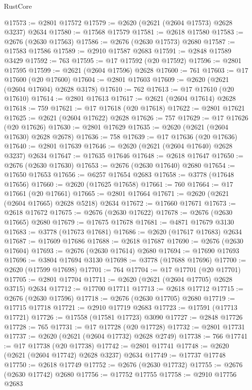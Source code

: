 \begin{lexlean}{RustCore}
\begin{coremodule}
@17573 := @2801 @17572
@17579 := @2620 (@2621 (@2604 @17573) @2628 @3237) @2634
@17580 := @17568 @17579
@17581 := @2618 @17580
@17583 := @2676 (@2630 @17563)
@17586 := @2676 (@2630 @17573) @2680
@17587 := @17583 @17586
@17589 := @2910 @17587 @2683
@17591 := @2848 @17589 @3429
@17592 := 763
@17595 := @17 @17592 (@20 @17592)
@17596 := @2801 @17595
@17599 := @2621 (@2604 @17596) @2628
@17600 := 761
@17603 := @17 @17600 (@20 @17600)
@17604 := @2801 @17603
@17609 := @2620 (@2621 (@2604 @17604) @2628 @3178)
@17610 := 762
@17613 := @17 @17610 (@20 @17610)
@17614 := @2801 @17613
@17617 := @2621 (@2604 @17614) @2628
@17618 := 759
@17621 := @17 @17618 (@20 @17618)
@17622 := @2801 @17621
@17625 := @2621 (@2604 @17622) @2628
@17626 := 757
@17629 := @17 @17626 (@20 @17626)
@17630 := @2801 @17629
@17635 := @2620 (@2621 (@2604 @17630) @2628 @2678)
@17636 := 758
@17639 := @17 @17636 (@20 @17636)
@17640 := @2801 @17639
@17646 := @2620 (@2621 (@2604 @17640) @2628 @3237) @2634
@17647 := @17635 @17646
@17648 := @2618 @17647
@17650 := @2676 (@2630 @17630)
@17653 := @2676 (@2630 @17640) @2680
@17654 := @17650 @17653
@17656 := @6257 @17654 @2683
@17658 := @3778 (@17648 @17656)
@17660 := @2620 (@17625 @17658)
@17661 := 760
@17664 := @17 @17661 (@20 @17661)
@17665 := @2801 @17664
@17671 := @2620 (@2621 (@2604 @17665) @2628 @5218) @2634
@17672 := @17660 @17671
@17673 := @2618 @17672
@17675 := @2676 (@2630 @17622)
@17678 := @2676 (@2630 @17665) @2680
@17679 := @17675 @17678
@17681 := @4871 @17679 @3130
@17683 := @3778 (@17673 @17681)
@17686 := @2620 (@17617 @17683) @2634
@17687 := @17609 @17686
@17688 := @2618 @17687
@17690 := @2676 (@2630 @17604)
@17693 := @2676 (@2630 @17614) @2680
@17694 := @17690 @17693
@17696 := @3804 @17694 @3130
@17698 := @3778 (@17688 @17696)
@17700 := @2620 (@17599 @17698)
@17701 := 764
@17704 := @17 @17701 (@20 @17701)
@17705 := @2801 @17704
@17711 := @2620 (@2621 (@2604 @17705) @2628 @3715) @2634
@17712 := @17700 @17711
@17713 := @2618 @17712
@17715 := @2676 (@2630 @17596)
@17718 := @2676 (@2630 @17705) @2680
@17719 := @17715 @17718
@17721 := @2910 @17719 @2683
@17723 := @17591 (@17713 @17721)
@17726 := @17558 (@17581 @17723) @3090
@17727 := @2848 @17726
@17728 := 765
@17731 := @17 @17728 (@20 @17728)
@17732 := @2801 @17731
@17737 := @2620 (@2621 (@2604 @17732) @2628 @2749)
@17738 := 766
@17741 := @17 @17738 (@20 @17738)
@17742 := @2801 @17741
@17748 := @2620 (@2621 (@2604 @17742) @2628 @3237) @2634
@17749 := @17737 @17748
@17750 := @2618 @17749
@17752 := @2676 (@2630 @17732)
@17755 := @2676 (@2630 @17742) @2680
@17756 := @17752 @17755
@17758 := @2910 @17756 @2683

\end{coremodule}
\end{lexlean}
